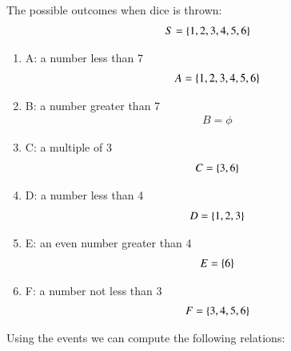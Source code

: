 \documentclass[journal,12pt,twocolumn]{IEEEtran}
\begin{document}
The possible outcomes when dice is thrown:
\begin{align}
    S = \left\{1,2,3,4,5,6\right\}
\end{align}
\begin{enumerate}
	\item A: a number less than 7
	     \begin{align}
	         A = \left\{1,2,3,4,5,6\right\}
	     \end{align}
	\item B: a number greater than 7
	     \begin{align}
	         B = \phi
	     \end{align}
	\item C: a multiple of 3
	     \begin{align}
	         C = \left\{3,6\right\}
	     \end{align}
	\item D: a number less than 4
	     \begin{align}
	         D = \left\{1,2,3\right\}
	     \end{align}
	\item E: an even number greater than 4
	     \begin{align}
	         E = \left\{6\right\}
	     \end{align}
	\item F: a number not less than 3
	     \begin{align}
	         F = \left\{3,4,5,6\right\}
	     \end{align}
\end{enumerate}
Using the events we can compute the following relations:\\
\end{document}
